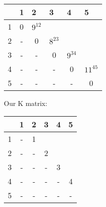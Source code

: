 \documentclass[12pt]{article}
\begin{document}
\begin{table}[h]
\centering
\begin{tabular}{|c|c|c|c|c|c|}
\hline
\multicolumn{1}{|l|}{} & \multicolumn{1}{|l|}{1} & \multicolumn{1}{l|}{2} & \multicolumn{1}{l|}{3} & \multicolumn{1}{l|}{4} & \multicolumn{1}{l|}{5} \\ \hline
1&0                       &       $9^{12}$              &                       &                       &                   \\ \hline
2&-                       & 0                     &   $8^{23}$                   &                       &                   \\ \hline
3&-                       & -                     & 0                     &     $ 9^{34} $                &                       \\ \hline
4&-                       & -                     & -                     & 0                     &       $11^{45}$                \\ \hline
5&-                       & -                     & -                     & -                     &    0                   \\ \hline
\end{tabular}
\end{table}
Our K matrix:\\
\begin{table}[h]
\centering
\begin{tabular}{|c|c|c|c|c|c|}
\hline
\multicolumn{1}{|l|}{} & \multicolumn{1}{|l|}{1} & \multicolumn{1}{l|}{2} & \multicolumn{1}{l|}{3} & \multicolumn{1}{l|}{4} & \multicolumn{1}{l|}{5} \\ \hline
1&  -                   &     1                 &                      &                      &                   \\ \hline
2&-                       & -                     &      2                 &                      &                   \\ \hline
3&-                       & -                     & -                     &     3                  &                       \\ \hline
4&-                       & -                     & -                     & -                     &   4                    \\ \hline
5&-                       & -                     & -                     & -                     &   -                   \\ \hline
\end{tabular}
\end{table}
\end{document}

